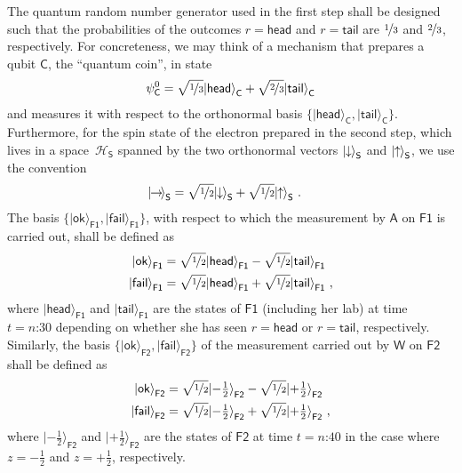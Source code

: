 \documentclass[12pt]{article}
\theoremstyle{plain}
\theoremstyle{definition}
\newcommand*{\cH}{\mathcal{H}}
\newcommand*{\ket}[1]{{| #1 \rangle}}
\newcommand*{\Friendone}{\mathsf{F1}}
\newcommand*{\Friendtwo}{\mathsf{F2}}
\newcommand*{\Assistant}{\mathsf{A}}
\newcommand*{\Wigner}{\mathsf{W}}
\newcommand*{\Spin}{\mathsf{S}}
\newcommand*{\Coin}{\mathsf{C}}
\newcommand*{\spinup}{\ket{{\hspace{-0.1ex}\uparrow\hspace{-0.1ex}}}}
\newcommand*{\spindown}{\ket{{\hspace{-0.1ex}\downarrow\hspace{-0.1ex}}}}
\newcommand*{\spinright}{\ket{{\hspace{-0.2ex}\rightarrow\hspace{-0.4ex}}}}
\newcommand*{\sminus}{{\textstyle - \frac{1}{2}}}
\newcommand*{\splus}{{\textstyle + \frac{1}{2}}}
\newcommand*{\ok}{\mathsf{ok}}
\newcommand*{\fail}{\mathsf{fail}}
\newcommand*{\head}{\mathsf{head}}
\newcommand*{\tail}{\mathsf{tail}}
\begin{document}
The quantum random number generator used in the first step shall be designed such that the probabilities of the outcomes $r=\head$ and $r=\tail$ are $\nicefrac{1}{3}$ and $\nicefrac{2}{3}$, respectively. For concreteness, we may think of a mechanism that prepares a qubit $\Coin$, the ``quantum coin'', in state 
\begin{align}  \label{eq_Qinitialstate}
  \psi^0_{\Coin} = \sqrt{\nicefrac{1}{3}} \ket{\head}_\Coin + \sqrt{\nicefrac{2}{3}} \ket{\tail}_\Coin
\end{align}
 and measures it with respect to the orthonormal basis $\{\ket{\head}_\Coin, \ket{\tail}_\Coin\}$. Furthermore, for the spin state of the electron prepared in the second step, which lives in a space~$\cH_{\Spin}$ spanned by the two orthonormal vectors $\spindown_{\Spin}$ and $\spinup_{\Spin}$, we use the convention
\begin{align*}
  \spinright_\Spin & =   \sqrt{\nicefrac{1}{2}} \spindown_\Spin + \sqrt{\nicefrac{1}{2}} \spinup_\Spin \ .
\end{align*}
The basis $\{\ket{\ok}_{\Friendone}, \ket{\fail}_{\Friendone}\}$, with respect to which the measurement by $\Assistant$ on $\Friendone$ is carried out, shall be defined as
\begin{align*}
  \ket{\ok}_{\Friendone} & = \sqrt{\nicefrac{1}{2}} \ket{\head}_{\Friendone} -  \sqrt{\nicefrac{1}{2}} \ket{\tail}_{\Friendone} \\
  \ket{\fail}_{\Friendone} & = \sqrt{\nicefrac{1}{2}} \ket{\head}_{\Friendone} + \sqrt{\nicefrac{1}{2}} \ket{\tail}_{\Friendone}  \ ,
\end{align*}
where $\ket{\head}_{\Friendone}$ and $\ket{\tail}_{\Friendone}$ are the states of $\Friendone$ (including her lab) at time $t = \text{$n$:30}$ depending on whether she has seen $r=\head$ or $r=\tail$, respectively. Similarly, the basis $\{\ket{\ok}_{\Friendtwo}, \ket{\fail}_{\Friendtwo}\}$ of the measurement carried out by $\Wigner$ on $\Friendtwo$ shall be defined as
\begin{align*}
    \ket{\ok}_{\Friendtwo} & = \sqrt{\nicefrac{1}{2}} \ket{\sminus}_{\Friendtwo} - \sqrt{\nicefrac{1}{2}} \ket{\splus}_{\Friendtwo} \\
  \ket{\fail}_{\Friendtwo} & = \sqrt{\nicefrac{1}{2}} \ket{\sminus}_{\Friendtwo} +  \sqrt{\nicefrac{1}{2}} \ket{\splus}_{\Friendtwo}  \ ,
\end{align*}
where $\ket{\sminus}_{\Friendtwo}$ and $\ket{\splus}_{\Friendtwo}$ are the states of $\Friendtwo$  at time $t = \text{$n$:40}$ in the case where $z = \sminus$ and $z = \splus$, respectively. 
\end{document}

